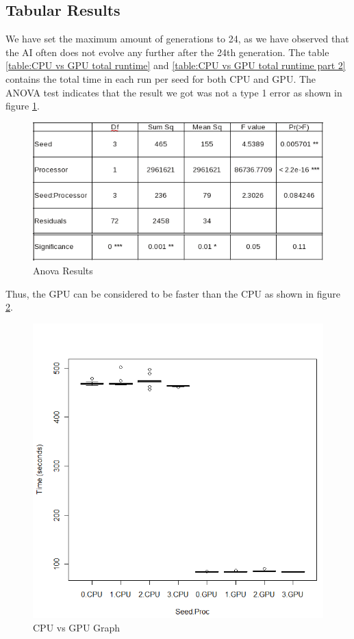\documentclass{acm_proc_article-sp}
\begin{document}
\subsection{Tabular Results} 
We have set the maximum amount of generations to 24, as we have observed 
that the AI often does not evolve any further after the 24th generation. The 
table \ref{table:CPU vs GPU total runtime} and 
\ref{table:CPU vs GPU total runtime part 2} contains the total time in each
run per seed for both CPU and GPU. The ANOVA test indicates that the result
we got was not a type 1 error as shown in figure \ref{fig:anova_result}.
\begin{figure}
	\centering
		\graphicspath{{images/}}
		\includegraphics[width=260 pt]{Anova_Results.png}
	\caption{Anova Results}
	\label{fig:anova_result}
\end{figure}
Thus, the GPU can be considered to be faster than the CPU as shown in figure
\ref{fig:anova_result_graph}.
\begin{figure}
	\centering
		\graphicspath{{images/}}
		\includegraphics[width=260 pt]{Anova_Result_Graph.png}
	\caption{CPU vs GPU Graph}
	\label{fig:anova_result_graph}
\end{figure}
\end{document}
